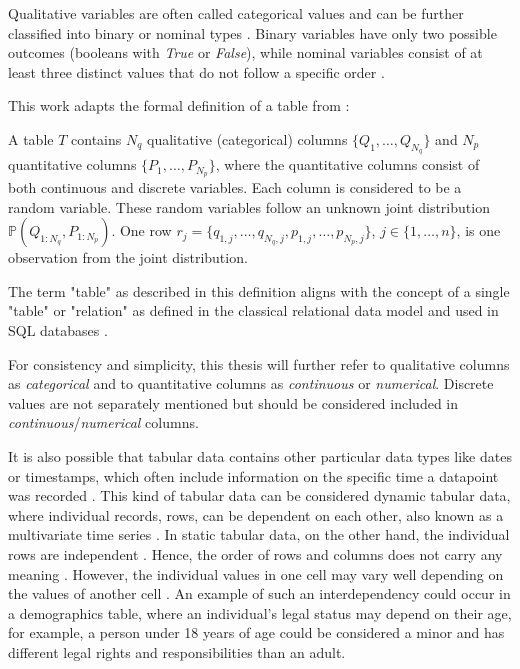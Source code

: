 Qualitative variables are often called categorical values and can be further classified into binary or nominal types \cite{lane2003IntroductionStatistics}.
Binary variables have only two possible outcomes (\eg booleans with \textit{True} or \textit{False}), while nominal variables consist of at least three distinct values that do not follow a specific order \cite{lederrey2022DATGANIntegratingExperta, lane2003IntroductionStatistics}.

\newpage
This work adapts the formal definition of a table from \cite{xu2019ModelingTabularData}:

\begin{displayquote}
A table \textbf{$T$} contains $N_q$ qualitative (categorical) columns $\{Q_1, \dots, Q_{N_q}\}$ and $N_p$ quantitative columns $\{P_1, \dots, P_{N_p}\}$, 
where the quantitative columns consist of both continuous and discrete variables. 
Each column is considered to be a random variable. 
These random variables follow an unknown joint distribution $\mathbb{P}(Q_{1:N_q}, P_{1:N_p})$. 
One row $r_j = \{q_{1,j}, \dots, q_{N_q,j}, p_{1,j}, \dots, p_{N_p,j}\}$, $j \in \{1, \dots, n\}$, is one observation from the joint distribution.
\end{displayquote}

The term "table" as described in this definition aligns with the concept of a single "table" or "relation" as defined in the classical relational data model \cite{codd1970RelationalModelData} and used in SQL databases \cite{w.eembley2009RelationalModel}.

For consistency and simplicity, this thesis will further refer to qualitative columns as \textit{categorical} and to quantitative columns as \textit{continuous} or \textit{numerical}. 
Discrete values are not separately mentioned but should be considered included in \textit{continuous}/\textit{numerical} columns.

It is also possible that tabular data contains other particular data types like dates or timestamps, which often include information on the specific time a datapoint was recorded \cite{hernandez2022SyntheticDataGeneration}.
This kind of tabular data can be considered dynamic tabular data, where individual records, \ie rows, can be dependent on each other, also known as a multivariate time series \cite{padhi2021TabularTransformersModeling}.
In static tabular data, on the other hand, the individual rows are independent \cite{padhi2021TabularTransformersModeling}.
Hence, the order of rows and columns does not carry any meaning \cite{somepalli2021SAINTImprovedNeural}.
However, the individual values in one cell may vary well depending on the values of another cell \cite{lederrey2022DATGANIntegratingExperta}.
An example of such an interdependency could occur in a demographics table, where an individual's legal status may depend on their age, 
for example, a person under 18 years of age could be considered a minor and has different legal rights and responsibilities than an adult.

